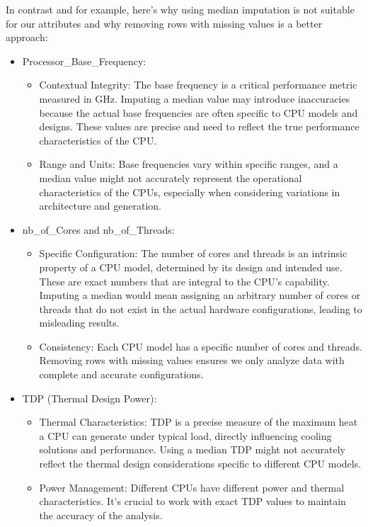 In contrast and for example, here's why using median imputation is not suitable for our attributes and why removing rows with missing values is a better approach:
\begin{itemize}
    \item Processor\_Base\_Frequency:
    \begin{itemize}
        \item Contextual Integrity: The base frequency is a critical performance metric measured in GHz. Imputing a median value may introduce inaccuracies because the actual base frequencies are often specific to CPU models and designs. These values are precise and need to reflect the true performance characteristics of the CPU.
        \item Range and Units: Base frequencies vary within specific ranges, and a median value might not accurately represent the operational characteristics of the CPUs, especially when considering variations in architecture and generation.
    \end{itemize}

    \item nb\_of\_Cores and nb\_of\_Threads:
    \begin{itemize}
        \item Specific Configuration: The number of cores and threads is an intrinsic property of a CPU model, determined by its design and intended use. These are exact numbers that are integral to the CPU's capability. Imputing a median would mean assigning an arbitrary number of cores or threads that do not exist in the actual hardware configurations, leading to misleading results.
        \item Consistency: Each CPU model has a specific number of cores and threads. Removing rows with missing values ensures we only analyze data with complete and accurate configurations.
    \end{itemize}

    \item TDP (Thermal Design Power):
    \begin{itemize}
        \item Thermal Characteristics: TDP is a precise measure of the maximum heat a CPU can generate under typical load, directly influencing cooling solutions and performance. Using a median TDP might not accurately reflect the thermal design considerations specific to different CPU models.
        \item Power Management: Different CPUs have different power and thermal characteristics. It's crucial to work with exact TDP values to maintain the accuracy of the analysis.
    \end{itemize}


\end{itemize}
